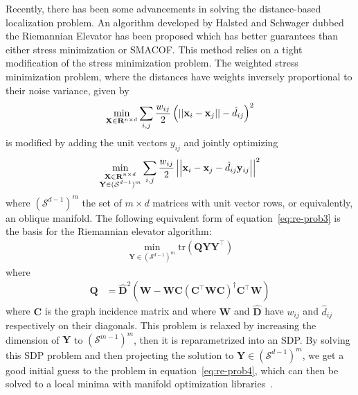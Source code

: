 Recently, there has been some advancements in solving the distance-based localization problem. An algorithm developed by Halsted and Schwager dubbed the Riemannian Elevator has been proposed which has better guarantees than either stress minimization or SMACOF. This method relies on a tight modification of the stress minimization problem. The weighted stress minimization problem, where the distances have weights inversely proportional to their noise variance, given by 
\begin{align}
    \min_{\mathbf{X} \in \mathbf{R}^{n \times d}} \sum_{i, j} \frac{w_{ij}}{2}\left(\left|\left|\mathbf{x}_i - \mathbf{x}_j\right|\right| - \hat{d}_{ij}\right)^2
\end{align}
is modified by adding the unit vectors $y_{ij}$ and jointly optimizing
\begin{align}
    \min_{\substack{
        \mathbf{X} \in \R{n \times d} \\
        \mathbf{Y} \in (\mathcal{S}^{d-1})^m
    }} 
    \sum_{i, j} \frac{w_{ij}}{2}\norm{\mathbf{x}_i - \mathbf{x}_j - \hat{d}_{ij}\mathbf{y}_{ij}}^2
    \label{eq:re-prob3}
\end{align}
where $(\mathcal{S}^{d-1})^m$ the set of $m \times d$ matrices with unit vector rows, or equivalently, an oblique manifold. The following equivalent form of equation~\ref{eq:re-prob3} is the basis for the Riemannian elevator algorithm:
\begin{align}
    \min_{\mathbf{Y} \in (\mathcal{S}^{d-1})^m}
    \text{tr}(\mathbf{Q Y Y}^\top)
    \label{eq:re-prob4}
\end{align}
where 
\begin{align}
    \mathbf{Q} &= \hat{\mathbf{D}}^2 \mathbf{(W - WC(C^\top W C)^\dagger C^\top W)}
\end{align}
where $\mathbf{C}$ is the graph incidence matrix and where $\mathbf{W}$ and $\hat{\mathbf{D}}$ have $w_{ij}$ and $\hat{{d}}_{ij}$ respectively on their diagonals. This problem is relaxed by increasing the dimension of $\mathbf{Y}$ to $(\mathcal{S}^{m-1})^m$, then it is reparametrized into an SDP. By solving this SDP problem and then projecting the solution to $\mathbf{Y} \in (\mathcal{S}^{d-1})^m$, we get a good initial guess to the problem in equation~\ref{eq:re-prob4}, which can then be solved to a local minima with manifold optimization libraries~\cite{pymanopt}.